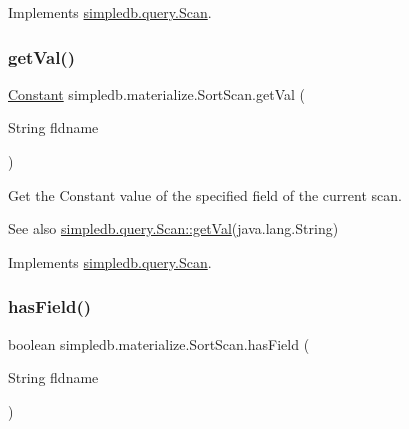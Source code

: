 Implements \hyperlink{interfacesimpledb_1_1query_1_1Scan_a922e219fee53ecfa6163525f9e3ef222}{simpledb.\+query.\+Scan}.

\mbox{\label{classsimpledb_1_1materialize_1_1SortScan_a6be5b206585dbd12c251a203364b5b1f}} 
\subsubsection{\texorpdfstring{get\+Val()}{getVal()}}
{\footnotesize\ttfamily \hyperlink{classsimpledb_1_1query_1_1Constant}{Constant} simpledb.\+materialize.\+Sort\+Scan.\+get\+Val (\begin{DoxyParamCaption}\item[{String}]{fldname }\end{DoxyParamCaption})\hspace{0.3cm}{\ttfamily [inline]}}

Get the Constant value of the specified field of the current scan. \begin{DoxySeeAlso}{See also}
\hyperlink{interfacesimpledb_1_1query_1_1Scan_aca80bca2857c983a88834bf6c01ee5ca}{simpledb.\+query.\+Scan\+::get\+Val}(java.\+lang.\+String) 
\end{DoxySeeAlso}


Implements \hyperlink{interfacesimpledb_1_1query_1_1Scan_aca80bca2857c983a88834bf6c01ee5ca}{simpledb.\+query.\+Scan}.

\mbox{\label{classsimpledb_1_1materialize_1_1SortScan_a9987dac3483863a86dd3a97495a1f522}} 
\subsubsection{\texorpdfstring{has\+Field()}{hasField()}}
{\footnotesize\ttfamily boolean simpledb.\+materialize.\+Sort\+Scan.\+has\+Field (\begin{DoxyParamCaption}\item[{String}]{fldname }\end{DoxyParamCaption})\hspace{0.3cm}{\ttfamily [inline]}}

